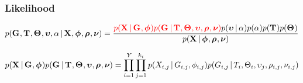 \begin{frame}[t]
    \frametitle{Likelihood}
    \begin{displaybox}
        \footnotesize
        \[
            p(\geneTreeVector, \divTimeMapVector, \demographicParamVector, 
            \locusMutationRateScalarVector, \locusRateHetShapeParameter \given
            \alignmentVector, \hkyModelVector, \ploidyScalarVector,
            \mutationRateScalarConstantVector) =
            \frac{\textcolor{red}{p(\alignmentVector \given \geneTreeVector, \hkyModelVector)
                p(\geneTreeVector \given \divTimeMapVector, \demographicParamVector,
                \locusMutationRateScalarVector, \ploidyScalarVector,
                \mutationRateScalarConstantVector)}
                p(\locusMutationRateScalarVector \given \locusRateHetShapeParameter)
                p(\locusRateHetShapeParameter)
                p(\divTimeMapVector)
                p(\demographicParamVector)}{
                p(\alignmentVector \given \hkyModelVector, \ploidyScalarVector,
                \mutationRateScalarConstantVector)}
        \]\vspace{0mm}
    \end{displaybox}
    \begin{displaybox}
        \footnotesize
        \[
            p(\alignmentVector \given \geneTreeVector, \hkyModelVector)
            p(\geneTreeVector \given \divTimeMapVector,
            \demographicParamVector, \locusMutationRateScalarVector,
            \ploidyScalarVector, \mutationRateScalarConstantVector) =
            \prod_{i=1}^{\npairs{}} \prod_{j=1}^{\nloci{i}} p(\alignment{i}{j}
            \given \geneTree{i}{j}, \hkyModel{i}{j}) p(\geneTree{i}{j} \given
            \divTimeMap{i}, \demographicParams{i}, \locusMutationRateScalar{j},
            \ploidyScalar{i}{j}, \mutationRateScalarConstant{i}{j})
        \]\vspace{0mm}
    \end{displaybox}
\end{frame}

